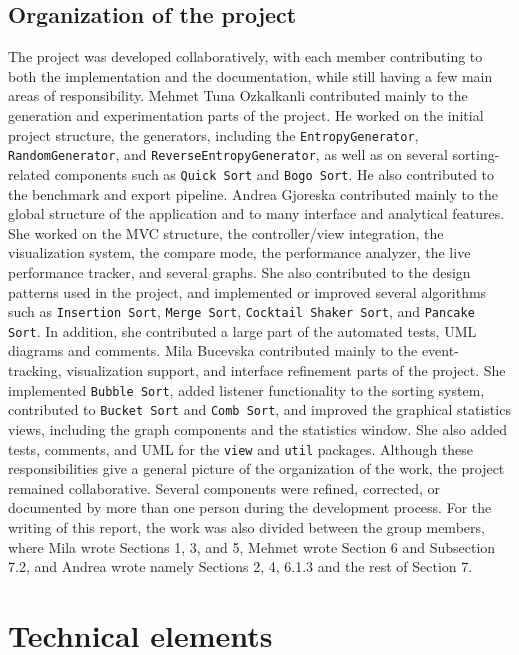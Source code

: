 \documentclass{article}
\begin{document}
\subsection{Organization of the project}
The project was developed collaboratively, with each member contributing to
both the implementation and the documentation, while still having a few 
main areas of responsibility.
Mehmet Tuna Ozkalkanli contributed mainly to the generation and 
experimentation parts of the project. He worked on the initial project 
structure, the generators, including the \texttt{EntropyGenerator}, \texttt{RandomGenerator}, and \texttt{ReverseEntropyGenerator}, as well 
as on several sorting-related components such as \texttt{Quick Sort} and \texttt{Bogo Sort}. He also contributed to the benchmark and export 
pipeline. 
Andrea Gjoreska contributed mainly to the global structure of the application
and to many interface and analytical features. She worked on the MVC 
structure, the controller/view integration, the visualization system, the 
compare mode, the performance analyzer, the live performance tracker, and
several graphs. She also contributed to the design patterns used in the 
project, and implemented or improved several algorithms such as \texttt{Insertion Sort}, \texttt{Merge Sort}, \texttt{Cocktail Shaker Sort}, 
and \texttt{Pancake Sort}. In addition, she contributed a large part of the 
automated tests, UML diagrams and comments.
Mila Bucevska contributed mainly to the event-tracking, visualization 
support, and interface refinement parts of the project. She implemented \texttt{Bubble Sort}, added listener functionality to the sorting system, 
contributed to \texttt{Bucket Sort} and \texttt{Comb Sort}, and improved 
the graphical statistics views, including the graph components and the 
statistics window. She also added tests, comments, and UML for the \texttt{view} and \texttt{util} packages.
Although these responsibilities give a general picture of the organization of 
the work, the project remained collaborative. Several components were 
refined, corrected, or documented by more than one person during the 
development process. For the writing of this report, the work was also 
divided between the group members, where Mila wrote Sections 1, 3, and 5, 
Mehmet wrote Section 6 and Subsection 7.2, and Andrea wrote namely 
Sections 2, 4, 6.1.3 and the rest of Section 7.

\section{Technical elements}
\end{document}
